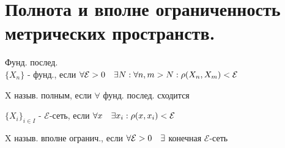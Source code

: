 \documentclass[geometry.tex]{subfiles}
\begin{document}
  \section{Полнота и вполне ограниченность метрических пространств.}

  \begin{definition}
      Фунд. послед.\\
      $\{X_n\}$ - фунд., если $\forall \mathcal{E} > 0 \quad \exists N: \forall n, m > N: \rho(X_n, X_m) < \mathcal{E}$
  \end{definition}

  \begin{definition}
      X назыв. полным, если $\forall$ фунд. послед. сходится
  \end{definition}

  \begin{definition}
      $\{X_i\}_{i \in I}$ - $\mathcal{E}$-сеть, если $\forall x \quad \exists x_i: \rho(x, x_i) < \mathcal{E}$
  \end{definition}

  \begin{definition}
      X назыв. вполне огранич., если $\forall \mathcal{E} > 0 \quad \exists$ конечная $\mathcal{E}$-сеть
  \end{definition}
\end{document}
